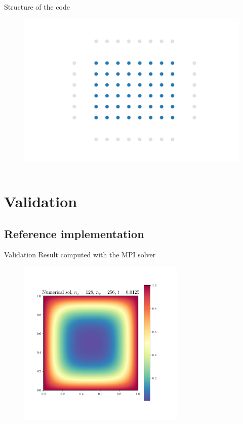 \documentclass[aspectratio=169]{beamer}
\begin{document}


\begin{frame}{Structure of the code}
    \vspace{-0.8cm}
    \begin{figure}
        \centering
        \includegraphics[width=0.8\linewidth]{Figures/step4.pdf}
    \end{figure}
    \vspace{-1.2cm}
    \inputminted[firstline=11, lastline=11,tabsize=4,fontsize=\footnotesize,framesep=2mm,bgcolor=codebgcolor,breaklines,linenos]{c}{../core.c}
\end{frame}



\section{Validation}
\subsection{Reference implementation}
\begin{frame}{Validation}
    Result computed with the MPI solver
    \begin{figure}
        \centering
        \includegraphics[height=8cm]{Figures/sol.pdf}
    \end{figure}
\end{frame}
\end{document}
